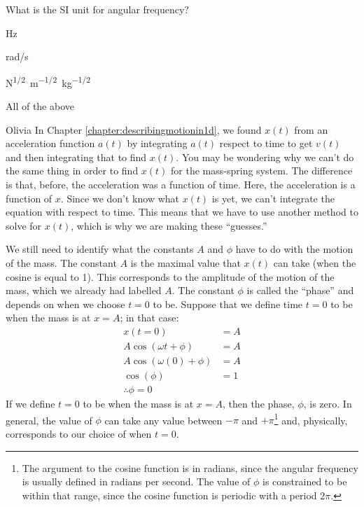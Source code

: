 \begin{checkpoint}\label{cp:simpleharmonicmotion:omega}
\begin{MCquestion}{What is the SI unit for angular frequency?}
\item \si{Hz}
\item \si{rad/s}
\item \si{N^{1/2}m^{-1/2}kg^{-1/2}}
\item All of the above \correct
\end{MCquestion}
\end{checkpoint}

\begin{studentOpinion}{Olivia}
In Chapter \ref{chapter:describingmotionin1d}, we found $x(t)$ from an acceleration function $a(t)$ by  integrating $a(t)$ respect to time to get $v(t)$ and then integrating that to find $x(t)$. You may be wondering why we can't do the same thing in order to find $x(t)$ for the mass-spring system. The difference is that, before, the acceleration was a function of time. Here, the acceleration is a function of $x$. Since we don't know what $x(t)$ is yet, we can't integrate the equation with respect to time. This means that we have to use another method to solve for $x(t)$, which is why we are making these ``guesses.'' 
\end{studentOpinion}

We still need to identify what the constants $A$ and $\phi$ have to do with the motion of the mass. The constant $A$ is the maximal value that $x(t)$ can take (when the cosine is equal to 1). This corresponds to the amplitude of the motion of the mass, which we already had labelled $A$. The constant $\phi$ is called the ``phase'' and depends on when we choose $t=0$ to be. Suppose that we define time $t=0$ to be when the mass is at $x=A$; in that case:
\begin{align*}
x(t=0) &= A\\
A \cos(\omega t + \phi) &= A\\
A \cos(\omega (0) + \phi) &= A\\
\cos(\phi) &= 1\\
\therefore \phi = 0
\end{align*}
If we define $t=0$ to be when the mass is at $x=A$, then the phase, $\phi$, is zero. In general, the value of $\phi$ can take any value between $-\pi$ and $+\pi$\footnote{The argument to the cosine function is in radians, since the angular frequency is usually defined in radians per second. The value of $\phi$ is constrained to be within that range, since the cosine function is periodic with a period $2\pi$.} and, physically, corresponds to our choice of when $t=0$.

